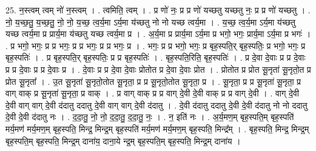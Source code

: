 \documentclass[17pt]{extarticle}
\begin{document}
25. न॒स्त्वम् त्वम् नो॑ न॒स्त्वम् । . त्वमिति॒ त्वम् । . प्र णो॑ नः॒ प्र प्र णो॑ यच्छतु यच्छतु नः॒ प्र प्र णो॑ यच्छतु । . नो॒ य॒च्छ॒तु॒ य॒च्छ॒तु॒ नो॒ नो॒ य॒च्छ॒ त्व॒र्य॒मा ऽर्य॒मा य॑च्छतु नो नो यच्छ त्वर्य॒मा । . य॒च्छ॒ त्व॒र्य॒मा ऽर्य॒मा य॑च्छतु यच्छ त्वर्य॒मा प्र प्रार्य॒मा य॑च्छतु यच्छ त्वर्य॒मा प्र । . अ॒र्य॒मा प्र प्रार्य॒मा ऽर्य॒मा प्र भगो॒ भगः॒ प्रार्य॒मा ऽर्य॒मा प्र भगः॑ । . प्र भगो॒ भगः॒ प्र प्र भगः॒ प्र प्र भगः॒ प्र प्र भगः॒ प्र । . भगः॒ प्र प्र भगो॒ भगः॒ प्र बृह॒स्पति॒र् बृह॒स्पतिः॒ प्र भगो॒ भगः॒ प्र बृह॒स्पतिः॑ । . प्र बृह॒स्पति॒र् बृह॒स्पतिः॒ प्र प्र बृह॒स्पतिः॑ । . बृह॒स्पति॒रिति॒ बृह॒स्पतिः॑ । . प्र दे॒वा दे॒वाः प्र प्र दे॒वाः प्र प्र दे॒वाः प्र प्र दे॒वाः प्र । . दे॒वाः प्र प्र दे॒वा दे॒वाः प्रोतोत प्र दे॒वा दे॒वाः प्रोत । . प्रोतोत प्र प्रोत सू॒नृता॑ सू॒नृतो॒त प्र प्रोत सू॒नृता᳚ । . उ॒त सू॒नृता॑ सू॒नृतो॒तोत सू॒नृता॒ प्र प्र सू॒नृतो॒तोत सू॒नृता॒ प्र । . सू॒नृता॒ प्र प्र सू॒नृता॑ सू॒नृता॒ प्र वाग् वाक् प्र सू॒नृता॑ सू॒नृता॒ प्र वाक् । . प्र वाग् वाक् प्र प्र वाग् दे॒वी दे॒वी वाक् प्र प्र वाग् दे॒वी । . वाग् दे॒वी दे॒वी वाग् वाग् दे॒वी द॑दातु ददातु दे॒वी वाग् वाग् दे॒वी द॑दातु । . दे॒वी द॑दातु ददातु दे॒वी दे॒वी द॑दातु नो नो ददातु दे॒वी दे॒वी द॑दातु नः । . द॒दा॒तु॒ नो॒ नो॒ द॒दा॒तु॒ द॒दा॒तु॒ नः॒ । . न॒ इति॑ नः । . अ॒र्य॒मण॒म् बृह॒स्पति॒म् बृह॒स्पति॑ मर्य॒मण॑ मर्य॒मण॒म् बृह॒स्पति॒ मिन्द्र॒ मिन्द्र॒म् बृह॒स्पति॑ मर्य॒मण॑ मर्य॒मण॒म् बृह॒स्पति॒ मिन्द्र᳚म् । . बृह॒स्पति॒ मिन्द्र॒ मिन्द्र॒म् बृह॒स्पति॒म् बृह॒स्पति॒ मिन्द्र॒म् दाना॑य॒ दाना॒ये न्द्र॒म् बृह॒स्पति॒म् बृह॒स्पति॒ मिन्द्र॒म् दाना॑य । \newline
\end{document}
